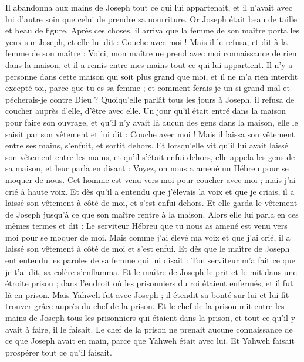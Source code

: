\begin{multicols}{2}
Il abandonna aux mains de Joseph tout ce qui lui appartenait, et il n’avait avec lui d’autre soin que celui de prendre sa nourriture. Or Joseph était beau de  taille et beau de figure.
Après ces choses, il arriva que la femme de son maître porta les yeux sur Joseph, et elle lui dit : Couche avec moi !
Mais il le refusa, et dit à la femme de son maître : Voici, mon maître ne prend avec moi connaissance de rien dans la maison, et il a remis entre mes mains tout ce qui lui appartient.
Il n'y a personne dans cette maison qui soit plus grand que moi, et il ne m'a rien interdit excepté toi, parce que tu es sa femme ; et comment ferais-je un si grand mal et pécherais-je contre Dieu ?
Quoiqu’elle parlât tous les jours à Joseph, il refusa de coucher auprès d’elle, d’être avec elle.
Un jour qu'il était entré dans la maison pour faire son ouvrage, et qu'il n'y avait là aucun des gens dans la maison,
elle le saisit par son vêtement et lui dit : Couche avec moi ! Mais il laissa son vêtement entre ses mains, s'enfuit, et sortit dehors.
Et lorsqu'elle vit qu'il lui avait laissé son vêtement entre les mains, et qu'il s'était enfui dehors,
elle appela les gens de sa maison, et leur parla en disant : Voyez, on nous a amené un Hébreu pour se moquer de nous.  Cet homme est venu vers moi pour coucher avec moi ; mais j'ai crié à haute voix.
Et dès qu’il a entendu que j’élevais la voix et que je  criais, il a laissé son vêtement à côté de moi, et s’est enfui dehors.
Et elle garda le vêtement de Joseph jusqu'à ce que son maître rentre à la maison.
Alors elle lui parla en ces mêmes termes et dit : Le serviteur Hébreu que tu nous as amené est venu vers moi pour se moquer de moi.
Mais comme j'ai élevé ma voix et que j'ai crié, il a laissé son vêtement à côté de moi et s'est enfui.
Et dès que le maître de Joseph eut entendu les paroles de sa femme qui lui disait : Ton serviteur m'a fait ce que je t'ai dit, sa colère s'enflamma.
Et le maître de Joseph le prit et le mit dans une étroite prison ; dans l'endroit où les prisonniers du roi étaient enfermés, et il fut là en prison.
Mais Yahweh fut avec Joseph ; il étendit sa bonté sur lui et lui fit trouver grâce auprès du chef de la prison.
Et le chef de la prison mit entre les mains de Joseph tous les prisonniers qui étaient dans la prison, et tout ce qu'il y avait à faire, il le faisait.
Le chef de la prison ne prenait aucune connaissance de ce que Joseph avait en main, parce que Yahweh était avec lui. Et Yahweh faisait prospérer tout ce qu'il faisait.

\end{multicols}
